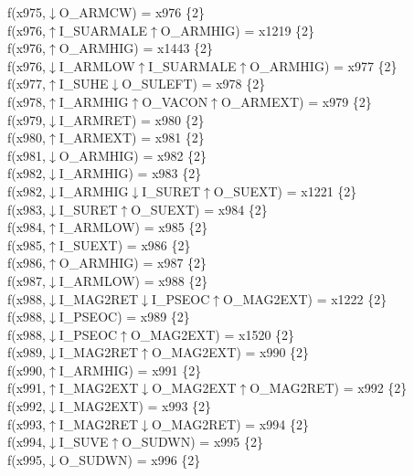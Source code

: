 f(x975,$\downarrow$O\_ARMCW) = x976 \{2\} \\  
f(x976,$\uparrow$I\_SUARMALE$\uparrow$O\_ARMHIG) = x1219 \{2\} \\  
f(x976,$\uparrow$O\_ARMHIG) = x1443 \{2\} \\  
f(x976,$\downarrow$I\_ARMLOW$\uparrow$I\_SUARMALE$\uparrow$O\_ARMHIG) = x977 \{2\} \\  
f(x977,$\uparrow$I\_SUHE$\downarrow$O\_SULEFT) = x978 \{2\} \\  
f(x978,$\uparrow$I\_ARMHIG$\uparrow$O\_VACON$\uparrow$O\_ARMEXT) = x979 \{2\} \\  
f(x979,$\downarrow$I\_ARMRET) = x980 \{2\} \\  
f(x980,$\uparrow$I\_ARMEXT) = x981 \{2\} \\  
f(x981,$\downarrow$O\_ARMHIG) = x982 \{2\} \\  
f(x982,$\downarrow$I\_ARMHIG) = x983 \{2\} \\  
f(x982,$\downarrow$I\_ARMHIG$\downarrow$I\_SURET$\uparrow$O\_SUEXT) = x1221 \{2\} \\  
f(x983,$\downarrow$I\_SURET$\uparrow$O\_SUEXT) = x984 \{2\} \\  
f(x984,$\uparrow$I\_ARMLOW) = x985 \{2\} \\  
f(x985,$\uparrow$I\_SUEXT) = x986 \{2\} \\  
f(x986,$\uparrow$O\_ARMHIG) = x987 \{2\} \\  
f(x987,$\downarrow$I\_ARMLOW) = x988 \{2\} \\  
f(x988,$\downarrow$I\_MAG2RET$\downarrow$I\_PSEOC$\uparrow$O\_MAG2EXT) = x1222 \{2\} \\  
f(x988,$\downarrow$I\_PSEOC) = x989 \{2\} \\  
f(x988,$\downarrow$I\_PSEOC$\uparrow$O\_MAG2EXT) = x1520 \{2\} \\  
f(x989,$\downarrow$I\_MAG2RET$\uparrow$O\_MAG2EXT) = x990 \{2\} \\  
f(x990,$\uparrow$I\_ARMHIG) = x991 \{2\} \\  
f(x991,$\uparrow$I\_MAG2EXT$\downarrow$O\_MAG2EXT$\uparrow$O\_MAG2RET) = x992 \{2\} \\  
f(x992,$\downarrow$I\_MAG2EXT) = x993 \{2\} \\  
f(x993,$\uparrow$I\_MAG2RET$\downarrow$O\_MAG2RET) = x994 \{2\} \\  
f(x994,$\downarrow$I\_SUVE$\uparrow$O\_SUDWN) = x995 \{2\} \\  
f(x995,$\downarrow$O\_SUDWN) = x996 \{2\} \\  
